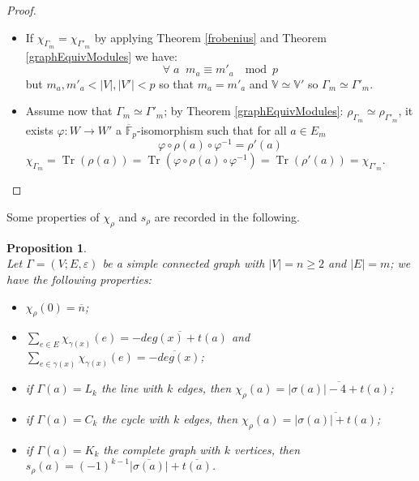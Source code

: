 \documentclass[preprint,12pt,authoryear]{elsarticle}
\newtheorem{prop}[thm]{Proposition}
\theoremstyle{definition}
\DeclareMathOperator{\Tr}{Tr}
\begin{document}
\begin{proof} \mbox{}
\begin{itemize}
\item[-] If $\chi_{\Gamma_m} = \chi_{\Gamma'_m}$ by applying Theorem  \ref{frobenius}  and  Theorem  \ref{graphEquivModules}  we have:
$$ \forall \; a \; \; m_a \equiv m'_a  \; \mod p$$
but $m_a, m'_a < |V|,|V'| < p$ so that $m_a=m'_a$ and $\mathbb{V} \simeq \mathbb{V}'$ so 
$\Gamma_m \simeq \Gamma'_m$.
\item[-]  Assume now that $\Gamma_m \simeq \Gamma'_m$; by Theorem  \ref{graphEquivModules}: $ {\displaystyle \rho_{\Gamma_m}\simeq \rho_{\Gamma'_m}}$,
it exists $\varphi: W \longrightarrow W'$ a $ \overline{\mathbb{F}}_p$-isomorphism such that for all $a \in {E}_m$
\[
\varphi\circ \rho (a)\circ  \varphi^{-1}= \rho'(a)
\]
$\chi_{\Gamma_{m}}= \Tr(\rho(a))= \Tr(\varphi\circ \rho (a)\circ  \varphi^{-1})= \Tr(\rho'(a))=\chi_{\Gamma'_{m}}$.\qedhere
\end{itemize}
\end{proof}



Some properties of  $\chi_{\rho}$ and $s_{\rho}$ are recorded in the following.


 \begin{prop}\textrm{}\\
 Let $\Gamma=(V;E,\varepsilon)$ be a simple connected graph with $|V|=n \ge 2$ and $|E|=m$; we have the following properties:
 
\begin{itemize}
\item[i)] $\chi_{\rho}(0) =  \overline{n} $;
\item[ii)]  ${\displaystyle \sum_{e\in E}\chi_{\gamma(x)}(e)= \overline{-deg(x)+ t(a)}}$ and  ${\displaystyle \sum_{e\in \gamma(x)}\chi_{\gamma(x)}(e)=\overline{-deg(x)}}$;
\item[iii)] if $\Gamma(a)=L_k$ the line with $k$ edges, then  $\chi_{\rho}(a)=\overline{|\sigma(a)|-4 +t(a)}$;
\item[iv)] if $\Gamma(a)=C_k$ the cycle with $k$ edges, then $\chi_{\rho}(a)=\overline{|\sigma(a)| + t(a)}$;
\item[v)]  if $\Gamma(a)=K_k$ the complete graph with $k$ vertices, then $s_{\rho}(a)=(-1)^{k-1}\overline{|\sigma(a)|} +
\overline{t(a)}$.
\end{itemize}
\end{prop}
\end{document}
